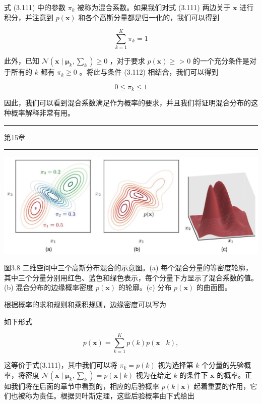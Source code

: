 \documentclass[10pt]{article}
\newcommand{\HRule}{\begin{center}\rule{0.9\linewidth}{0.2mm}\end{center}}
\begin{document}
式 (3.111) 中的参数 \({\pi }_{k}\) 被称为混合系数。如果我们对式 (3.111) 两边关于 \(\mathbf{x}\) 进行积分，并注意到 \(p\left( \mathbf{x}\right)\) 和各个高斯分量都是归一化的，我们可以得到

\[
\mathop{\sum }\limits_{{k = 1}}^{K}{\pi }_{k} = 1 \tag{3.112}
\]

此外，已知 \(\mathcal{N}\left( {\mathbf{x} \mid  {\mathbf{\mu }}_{k},{\mathbf{\sum }}_{k}}\right)  \geq  0\) ，对于要求 \(p\left( \mathbf{x}\right)  \geq\) > 0 的一个充分条件是对于所有的 \(k\) 都有 \({\pi }_{k} \geq  0\) 。将此与条件 (3.112) 相结合，我们可以得到

\[
0 \leq  {\pi }_{k} \leq  1 \tag{3.113}
\]

因此，我们可以看到混合系数满足作为概率的要求，并且我们将证明混合分布的这种概率解释非常有用。

\HRule

第15章

\HRule

\begin{center}
\includegraphics[max width=1.0\textwidth]{images/0194e279-9b28-703a-88f4-c3ac21e2010d_107_199_343_1295_493_0.jpg}
\end{center}
\hspace*{3em} 

图3.8 二维空间中三个高斯分布混合的示意图。(a) 每个混合分量的等密度轮廓，其中三个分量分别用红色、蓝色和绿色表示，每个分量下方显示了混合系数的值。(b) 混合分布的边缘概率密度 \(p\left( \mathbf{x}\right)\) 的轮廓。(c) 分布 \(p\left( \mathbf{x}\right)\) 的曲面图。

根据概率的求和规则和乘积规则，边缘密度可以写为

如下形式

\[
p\left( \mathbf{x}\right)  = \mathop{\sum }\limits_{{k = 1}}^{K}p\left( k\right) p\left( {\mathbf{x} \mid  k}\right) , \tag{3.114}
\]

这等价于式(3.111)，其中我们可以将 \({\pi }_{k} = p\left( k\right)\) 视为选择第 \(k\) 个分量的先验概率，将密度 \(\mathcal{N}\left( {\mathbf{x} \mid  {\mathbf{\mu }}_{k},{\mathbf{\sum }}_{k}}\right)  = p\left( {\mathbf{x} \mid  k}\right)\) 视为在给定 \(k\) 的条件下 \(\mathbf{x}\) 的概率。正如我们将在后面的章节中看到的，相应的后验概率 \(p\left( {k \mid  \mathbf{x}}\right)\) 起着重要的作用，它们也被称为责任。根据贝叶斯定理，这些后验概率由下式给出
\end{document}
